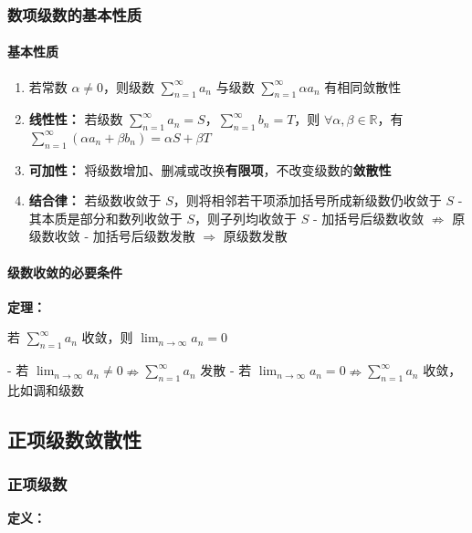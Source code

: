 \documentclass[lang = zh , final , oneside , openany , titlepage , zihao = -4 , linespread = 1.3 , baselineskip = false , cjk-font = windows , text-font = newtx , math-font = newtx]{sjtureport}
\begin{document}
\subsubsection{数项级数的基本性质}

\paragraph{基本性质}

\begin{enumerate}
    \item 若常数 \(\alpha \neq 0\)，则级数 \(\sum_{n = 1}^\infty a_n\) 与级数 \(\sum_{n = 1}^\infty \alpha a_n\) 有相同敛散性
    \item \textbf{线性性：} 若级数 \(\sum_{n = 1}^\infty a_n = S\)，\(\sum_{n = 1}^\infty b_n = T\)，则 \(\forall \alpha, \beta\in \mathbb{R}\)，有 \(\sum_{n = 1}^\infty (\alpha a_n + \beta b_n) = \alpha S + \beta T\)
    \item \textbf{可加性：} 将级数增加、删减或改换\textbf{有限项}，不改变级数的\textbf{敛散性}
    \item \textbf{结合律：} 若级数收敛于 \(S\)，则将相邻若干项添加括号所成新级数仍收敛于 \(S\)
        - 其本质是部分和数列收敛于 \(S\)，则子列均收敛于 \(S\)
        - 加括号后级数收敛 \(\nRightarrow\) 原级数收敛
        - 加括号后级数发散 \(\Rightarrow\) 原级数发散
\end{enumerate}

\paragraph{级数收敛的必要条件}

\textbf{定理：}

若 \(\sum_{n = 1}^\infty a_n\) 收敛，则 \(\lim_{n\to\infty} a_n = 0\)

- 若 \(\lim_{n\to\infty} a_n \neq 0 \nRightarrow \sum_{n = 1}^\infty a_n\) 发散
- 若 \(\lim_{n\to\infty} a_n = 0 \nRightarrow \sum_{n = 1}^\infty a_n\) 收敛，比如调和级数

\subsection{正项级数敛散性}

\subsubsection{正项级数}

\textbf{定义：}
\end{document}
